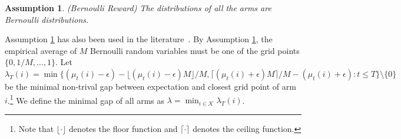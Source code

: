 \documentclass[letterpaper]{article} %
\newtheorem{assumption}{Assumption}
\begin{document}
\begin{assumption}\label{ass:lambda}
\emph{(Bernoulli Reward)} The distributions of all the arms are Bernoulli distributions.
\end{assumption}
Assumption \ref{ass:lambda} has also been used in the literature~\cite{besbes2014stochastic,mellor2013thompson,kaufmann2012thompson,agrawal2012analysis}. By Assumption \ref{ass:lambda}, the empirical average of $M$ Bernoulli random variables must be one of the grid points $\{0,1/M,\ldots,1\}$. Let $\lambda_T(i)=\min\{(\mu_t(i)-\epsilon)-{\lfloor (\mu_t(i)-\epsilon)M\rfloor}/{M}, {\lceil (\mu_t(i)+\epsilon)M\rceil}/{M}-(\mu_t(i)+\epsilon): t \leq T\}\setminus\{0\}$ be the minimal non-trival gap between expectation and closest grid point of arm $i$.\footnote{Note that $\lfloor\cdot\rfloor$ denotes the floor function and $\lceil\cdot\rceil$ denotes the ceiling function.} We define the minimal gap of all arms as $\lambda=\min_{i\in\mathcal{K}}\lambda_T(i)$.
\end{document}
